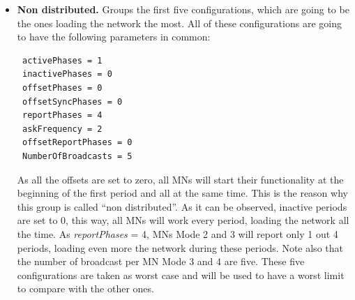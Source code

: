 \begin{itemize}
 \item \textbf{Non distributed. }Groups the first five configurations, which are going to be the ones loading the network the most. All of these
configurations are going to have the following parameters in common:
\begin{verbatim}
 activePhases = 1
 inactivePhases = 0
 offsetPhases = 0
 offsetSyncPhases = 0
 reportPhases = 4 
 askFrequency = 2
 offsetReportPhases = 0
 NumberOfBroadcasts = 5
\end{verbatim}
As all the offsets are set to zero, all \acp{MN} will start their functionality at the beginning of the first period and all at the same
time. This is the reason why this group is called ``non distributed''. As it can be observed, inactive periods are set to 0, this way, all \acp{MN} will 
work every period, loading the network all the time. As \textit{reportPhases} = 4, \acp{MN} Mode 2 and 3 will report only 1 out 4 periods, loading even
more the network during these periods. Note also that the number of broadcast per \ac{MN} Mode 3 and 4 are five. These five configurations are taken as
 worst case and will be used to have a worst limit to compare with the other ones.


\end{itemize}
